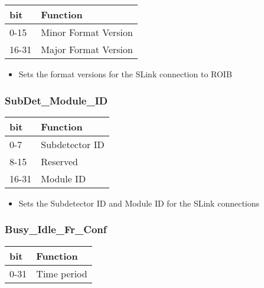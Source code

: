 \begin {table}[H]
\begin{center}
\begin{tabular}{|l|l|}
\hline
\textbf{bit} & \textbf{Function} \\
\hline
0-15 & Minor Format Version \\
\hline
16-31 & Major Format Version \\
\hline
\end{tabular}
\end{center}
\end{table}


\begin{itemize}
\item Sets the format versions for the SLink connection to ROIB
\end{itemize}




\subsubsection{SubDet\_Module\_ID}

\begin {table}[H]
\begin{center}
\begin{tabular}{|l|l|}
\hline
\textbf{bit} & \textbf{Function} \\
\hline
0-7 & Subdetector ID \\
\hline
8-15 & Reserved \\
\hline
16-31 & Module ID \\
\hline
\end{tabular}
\end{center}
\end{table}


\begin{itemize}
\item Sets the Subdetector ID and Module ID for the SLink connections
\end{itemize}




\subsubsection{Busy\_Idle\_Fr\_Conf}

\begin {table}[H]
\begin{center}
\begin{tabular}{|l|l|}
\hline
\textbf{bit} & \textbf{Function} \\
\hline
0-31 & Time period \\
\hline
\end{tabular}
\end{center}
\end{table}


